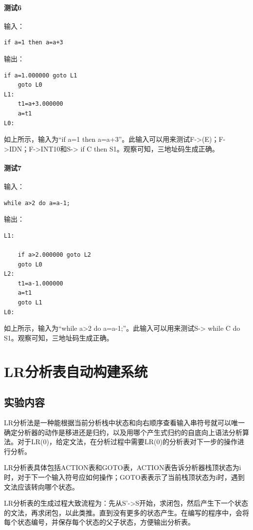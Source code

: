 \documentclass{ctexrep}
\begin{document}
\subsubsection{测试6}
输入：
\begin{verbatim}
if a=1 then a=a+3
\end{verbatim}

输出：
\begin{verbatim}
if a=1.000000 goto L1
    goto L0
L1:
    t1=a+3.000000
    a=t1
L0:
\end{verbatim}

如上所示，输入为“if a=1 then a=a+3”。此输入可以用来测试F->(E)；F->IDN；F->INT10和S-> if C then S1。观察可知，三地址码生成正确。

\subsubsection{测试7}
输入：
\begin{verbatim}
while a>2 do a=a-1;
\end{verbatim}

输出：
\begin{verbatim}
L1:

    if a>2.000000 goto L2
    goto L0
L2:
    t1=a-1.000000
    a=t1
    goto L1
L0:
\end{verbatim}

如上所示，输入为“while a>2 do a=a-1;”。此输入可以用来测试S-> while C do S1。观察可知，三地址码生成正确。


\chapter{LR分析表自动构建系统}
\section{实验内容}
LR分析法是一种能根据当前分析栈中状态和向右顺序查看输入串符号就可以唯一确定分析器的动作是移进还是归约，以及用哪个产生式归约的自底向上语法分析算法。对于LR(0)，给定文法，在分析过程中需要LR(0)的分析表对下一步的操作进行分析。

LR分析表具体包括ACTION表和GOTO表，ACTION表告诉分析器栈顶状态为i时，对于下一个输入符号应如何操作；GOTO表表示了当前栈顶状态为i时，遇到文法应该转向哪个状态。

LR分析表的生成过程大致流程为：先从S’->S开始，求闭包，然后产生下一个状态的文法，再求闭包，以此类推。直到没有更多的状态产生。在编写的程序中，会将每个状态编号，并保存每个状态的父子状态，方便输出分析表。
\end{document}
